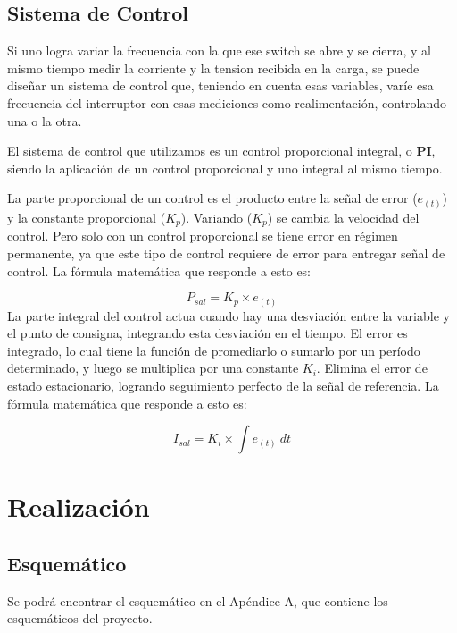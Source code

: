             \subsection{Sistema de Control}
                Si uno logra variar la frecuencia con la que ese switch se abre y se cierra, y al mismo tiempo medir la corriente y la tension recibida en la carga, se puede diseñar un sistema de control que, teniendo en cuenta esas variables, varíe esa frecuencia del interruptor con esas mediciones como realimentación, controlando una o la otra.\par
                El sistema de control que utilizamos es un control proporcional integral, o \textbf{PI}, siendo la aplicación de un control proporcional y uno integral al mismo tiempo.\par
                La parte proporcional de un control es el producto entre la señal de error ($e_{(t)}$) y la constante proporcional ($K_p$). Variando ($K_p$) se cambia la velocidad del control. Pero solo con un control proporcional se tiene error en régimen permanente, ya que este tipo de control requiere de error para entregar señal de control. La fórmula matemática que responde a esto es:\par
                \begin{equation}
                    P_{sal} = K_p \times e_{(t)}
                \end{equation}
                La parte integral del control actua cuando hay una desviación entre la variable y el punto de consigna, integrando esta desviación en el tiempo. El error es integrado, lo cual tiene la función de promediarlo o sumarlo por un período determinado, y luego se multiplica por una constante $K_i$. Elimina el error de estado estacionario, logrando seguimiento perfecto de la señal de referencia. La fórmula matemática que responde a esto es:\par
                \begin{equation}
                    I_{sal} = K_i \times \int e_{(t)} \ dt
                \end{equation}
                
        \section{Realización}
            \subsection{Esquemático}
                Se podrá encontrar el esquemático en el Apéndice A, que contiene los esquemáticos del proyecto.\par
            
